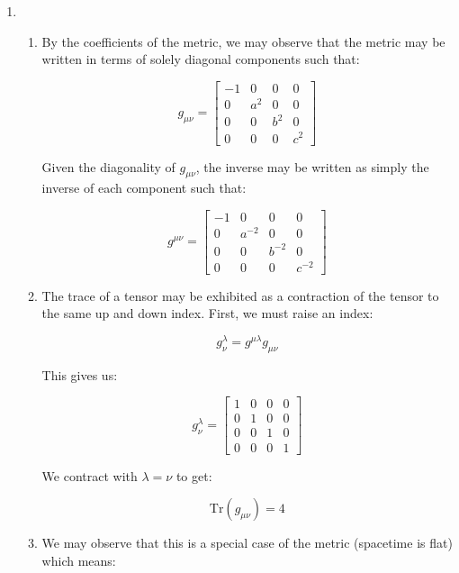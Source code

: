 \begin{enumerate}

  \item

    \begin{enumerate}

      \item By the coefficients of the metric, we may observe that the metric may be written in terms of solely diagonal components such that:

        $$\boxed{g_{\mu\nu}=\left[ \begin{matrix} -1 & 0 & 0 & 0\\ 0 & a^2 & 0 & 0\\ 0 & 0 & b^2 & 0\\ 0 & 0 & 0 & c^2 \end{matrix}\right]}$$

          Given the diagonality of $g_{\mu\nu}$, the inverse may be written as simply the inverse of each component such that:

          $$\boxed{g^{\mu\nu}=\left[ \begin{matrix} -1 & 0 & 0 & 0\\ 0 & a^{-2} & 0 & 0\\ 0 & 0 & b^{-2} & 0\\ 0 & 0 & 0 & c^{-2} \end{matrix}\right]}$$

      \item 

        The trace of a tensor may be exhibited as a contraction of the tensor to the same up and down index. First, we must raise an index:

        $$g^{\lambda}_{\nu}=g^{\mu\lambda}g_{\mu\nu}$$

        This gives us:

        $$g^{\lambda}_{\nu}=\left[ \begin{matrix} 1 & 0 & 0 & 0\\ 0 & 1 & 0 & 0\\ 0 & 0 & 1 & 0\\ 0 & 0 & 0 & 1\end{matrix} \right]$$

        We contract with $\lambda=\nu$ to get:

        $$\boxed{\text{Tr}(g_{\mu\nu})=4}$$

      \item 

        We may observe that this is a special case of the metric (spacetime is flat) which means:


\end{enumerate}
\end{enumerate}
